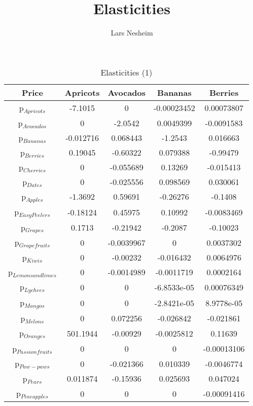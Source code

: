 \documentclass[11pt]{article}
\title{Elasticities}
\author{Lars Nesheim}
\date{}
\begin{document}
\maketitle
\begin{table}[h]
\caption{Elasticities}
\label{Table: elasticities}
\begin{center}
\begin{table}[h]
\caption{Elasticities (1)}
\label{Table: elasticities 1}
\begin{center}
\begin{tabular}{ccccc}
Price & Apricots & Avocados & Bananas & Berries \\ \hline
p$_{Apricots}$ & -7.1015 & 0 & -0.00023452 & 0.00073807 \\ 
p$_{Avocados}$ & 0 & -2.0542 & 0.0049399 & -0.0091583 \\ 
p$_{Bananas}$ & -0.012716 & 0.068443 & -1.2543 & 0.016663 \\ 
p$_{Berries}$ & 0.19045 & -0.60322 & 0.079388 & -0.99479 \\ 
p$_{Cherries}$ & 0 & -0.055689 & 0.13269 & -0.015413 \\ 
p$_{Dates}$ & 0 & -0.025556 & 0.098569 & 0.030061 \\ 
p$_{Apples}$ & -1.3692 & 0.59691 & -0.26276 & -0.1408 \\ 
p$_{Easy Peelers}$ & -0.18124 & 0.45975 & 0.10992 & -0.0083469 \\ 
p$_{Grapes}$ & 0.1713 & -0.21942 & -0.2087 & -0.10023 \\ 
p$_{Grapefruits}$ & 0 & -0.0039967 & 0 & 0.0037302 \\ 
p$_{Kiwis}$ & 0 & -0.00232 & -0.016432 & 0.0064976 \\ 
p$_{Lemons and limes}$ & 0 & -0.0014989 & -0.0011719 & 0.0002164 \\ 
p$_{Lychees}$ & 0 & 0 & -6.8533e-05 & 0.00076349 \\ 
p$_{Mangos}$ & 0 & 0 & -2.8421e-05 & 8.9778e-05 \\ 
p$_{Melons}$ & 0 & 0.072256 & -0.026842 & -0.021861 \\ 
p$_{Oranges}$ & 501.1944 & -0.00929 & -0.0025812 & 0.11639 \\ 
p$_{Passion fruits}$ & 0 & 0 & 0 & -0.00013106 \\ 
p$_{Paw-paws}$ & 0 & -0.021366 & 0.010339 & -0.0046774 \\ 
p$_{Pears}$ & 0.011874 & -0.15936 & 0.025693 & 0.047024 \\ 
p$_{Pineapples}$ & 0 & 0 & 0 & -0.00091416 \\ 

\end{tabular}
\end{center}
\end{table}
\end{center}
\end{table}
\end{document}
